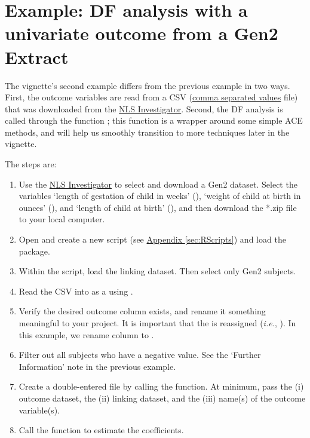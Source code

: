 \documentclass{article}\usepackage[]{graphicx}\usepackage[]{color}
\begin{document}
\section{Example: DF analysis with a univariate outcome from a Gen2 Extract}
The vignette's second example differs from the previous example in two ways.  First, the outcome variables are read from a CSV (\href{http://en.wikipedia.org/wiki/Comma-separated_values}{comma separated values} file) that was downloaded from the \hyperref[term:NlsInvestigator]{NLS Investigator}.  Second, the DF analysis is called through the function ; this function is a wrapper around some simple ACE methods, and will help us smoothly transition to more techniques later in the vignette.   

The steps are:
\begin{enumerate}
\item Use the \hyperref[term:NlsInvestigator]{NLS Investigator} to select and download a Gen2 dataset.  Select the variables `length of gestation of child in weeks' (), `weight of child at birth in ounces' (), and `length of child at birth' (), and then download the *.zip file to your local computer.

\item Open \R{} and create a new script (see \hyperref[sec:RScripts]{Appendix \ref*{sec:RScripts}}) and load the  package.
\item Within the \R{} script, load the linking dataset.  Then select only Gen2 subjects.
\item Read the CSV into \R{} as a  using .
\item Verify the desired outcome column exists, and rename it something meaningful to your project.  It is important that the  is reassigned (\emph{i.e.}, ).  In this example, we rename column  to .
\item Filter out all subjects who have a negative  value.  See the `Further Information' note in the previous example.
\item Create a double-entered file by calling the  function.  At minimum, pass the (i) outcome dataset, the (ii) linking dataset, and the (iii) name(s) of the outcome variable(s). 
\item Call the  function to estimate the coefficients.
\end{enumerate}
\end{document}
